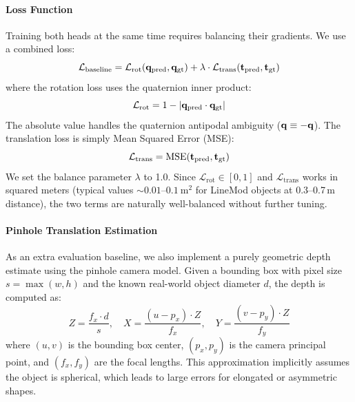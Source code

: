 \paragraph{Loss Function}
Training both heads at the same time requires balancing their gradients. We use a combined loss:
\begin{equation}
    \mathcal{L}_{\text{baseline}} = \mathcal{L}_{\text{rot}}(\mathbf{q}_{\text{pred}}, \mathbf{q}_{\text{gt}}) + \lambda \cdot \mathcal{L}_{\text{trans}}(\mathbf{t}_{\text{pred}}, \mathbf{t}_{\text{gt}})
    \label{eq:baseline_loss}
\end{equation}
where the rotation loss uses the quaternion inner product:
\begin{equation}
    \mathcal{L}_{\text{rot}} = 1 - |\mathbf{q}_{\text{pred}} \cdot \mathbf{q}_{\text{gt}}|
    \label{eq:rot_loss}
\end{equation}
The absolute value handles the quaternion antipodal ambiguity ($\mathbf{q} \equiv -\mathbf{q}$). The translation loss is simply Mean Squared Error (MSE):
\begin{equation}
    \mathcal{L}_{\text{trans}} = \text{MSE}(\mathbf{t}_{\text{pred}}, \mathbf{t}_{\text{gt}})
    \label{eq:trans_loss}
\end{equation}
We set the balance parameter $\lambda$ to 1.0. Since $\mathcal{L}_{\text{rot}} \in [0, 1]$ and $\mathcal{L}_{\text{trans}}$ works in squared meters (typical values $\sim 0.01$--$0.1~\text{m}^2$ for LineMod objects at 0.3--0.7\,m distance), the two terms are naturally well-balanced without further tuning.

\paragraph{Pinhole Translation Estimation}
As an extra evaluation baseline, we also implement a purely geometric depth estimate using the pinhole camera model. Given a bounding box with pixel size $s = \max(w, h)$ and the known real-world object diameter $d$, the depth is computed as:
\begin{equation}
    Z = \frac{f_x \cdot d}{s}, \quad X = \frac{(u - p_x) \cdot Z}{f_x}, \quad Y = \frac{(v - p_y) \cdot Z}{f_y}
    \label{eq:pinhole}
\end{equation}
where $(u, v)$ is the bounding box center, $(p_x, p_y)$ is the camera principal point, and $(f_x, f_y)$ are the focal lengths. This approximation implicitly assumes the object is spherical, which leads to large errors for elongated or asymmetric shapes.

